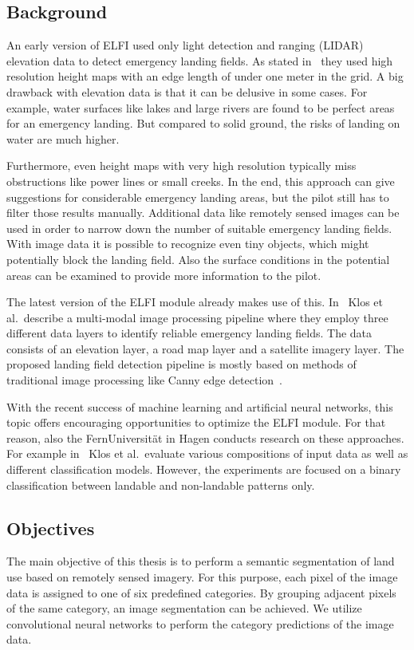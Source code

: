 \subsection{Background}
An early version of ELFI used only light detection and ranging (LIDAR) elevation data to detect emergency landing fields. As stated in~\cite{feu_elfi} they used high resolution height maps with an edge length of under one meter in the grid. A big drawback with elevation data is that it can be delusive in some cases. For example, water surfaces like lakes and large rivers are found to be perfect areas for an emergency landing. But compared to solid ground, the risks of landing on water are much higher.

Furthermore, even height maps with very high resolution typically miss obstructions like power lines or small creeks. In the end, this approach can give suggestions for considerable emergency landing areas, but the pilot still has to filter those results manually. Additional data like remotely sensed images can be used in order to narrow down the number of suitable emergency landing fields. With image data it is possible to recognize even tiny objects, which might potentially block the landing field. Also the surface conditions in the potential areas can be examined to provide more information to the pilot.

The latest version of the ELFI module already makes use of this. In~\cite{elfi_pipeline19} Klos et al.\ describe a multi-modal image processing pipeline where they employ three different data layers to identify reliable emergency landing fields. The data consists of an elevation layer, a road map layer and a satellite imagery layer. The proposed landing field detection pipeline is mostly based on methods of traditional image processing like Canny edge detection~\cite{canny_edge86}.

With the recent success of machine learning and artificial neural networks, this topic offers encouraging opportunities to optimize the ELFI module. For that reason, also the FernUniversität in Hagen conducts research on these approaches. For example in~\cite{elfi_transfer20} Klos et al.\ evaluate various compositions of input data as well as different classification models. However, the experiments are focused on a binary classification between landable and non-landable patterns only.

\subsection{Objectives}
The main objective of this thesis is to perform a semantic segmentation of land use based on remotely sensed imagery. For this purpose, each pixel of the image data is assigned to one of six predefined categories. By grouping adjacent pixels of the same category, an image segmentation can be achieved. We utilize convolutional neural networks to perform the category predictions of the image data.

